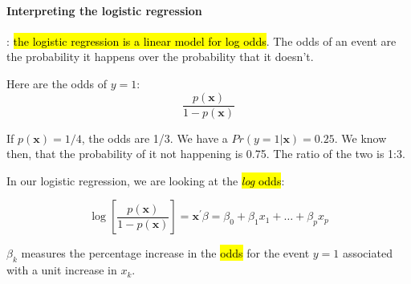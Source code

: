 \documentclass[11pt]{article}
\begin{document}
\paragraph{Interpreting the logistic regression}: \hl{the logistic regression is a linear model for log odds}. The odds of an event are the probability it happens over the probability that it doesn't. 

Here are the odds of $y=1$:
\begin{equation*}
    \dfrac{p(\mathbf{x})}{1-p(\mathbf{x})}
\end{equation*}

If $p(\mathbf{x}) = 1/4$, the odds are 1/3. We have a $Pr(y=1|\mathbf{x}) = 0.25$. We know then, that the probability of it not happening is 0.75. The ratio of the two is 1:3.

In our logistic regression, we are looking at the \hl{\textit{log} odds}:

\begin{equation}
    \log\left[\dfrac{p(\mathbf{x})}{1-p(\mathbf{x})}\right] = \mathbf{x^\prime}\beta = \beta_0 + \beta_1 x_1 + \ldots + \beta_p x_p
\end{equation}

$\beta_k$ measures the percentage increase in the \hl{odds} for the event $y = 1$ associated with a unit increase in $x_k$.
\end{document}

